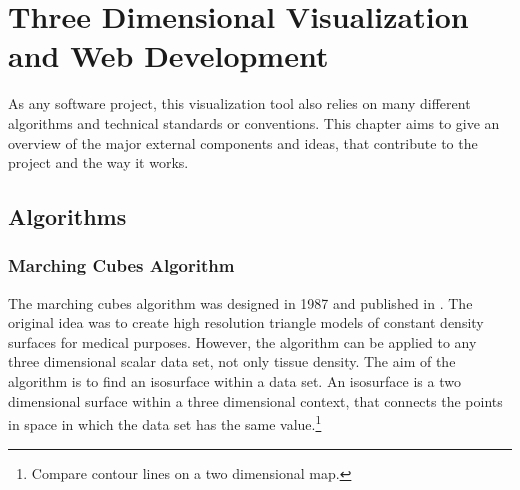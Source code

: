 \chapter{Three Dimensional Visualization and Web Development}

As any software project, this visualization tool also relies on many different algorithms and technical standards or conventions. This chapter aims to give an overview of the major external components and ideas, that contribute to the project and the way it works.
\section{Algorithms}
\subsection{Marching Cubes Algorithm} \label{chp2:Cubes}
The marching cubes algorithm was designed in 1987 and published in \cite{MarchCubes}. The original idea was to create high resolution triangle models of constant density surfaces for medical purposes. However, the algorithm can be applied to any three dimensional scalar data set, not only tissue density. The aim of the algorithm is to find an isosurface within a data set. An isosurface is a two dimensional surface within a three dimensional context, that connects the points in space in which the data set has the same value.\footnote{Compare contour lines on a two dimensional map.}

